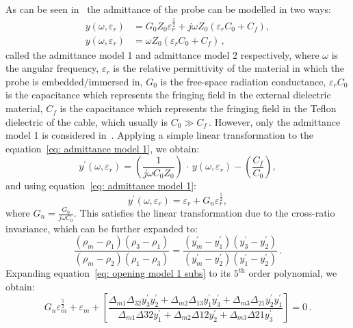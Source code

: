 \documentclass[12pt, a4paper]{article}
\begin{document}
As can be seen in~\cite{marsland1987dielectric} the admittance of the probe can be modelled in two ways:
\begin{align}
    y(\omega, \varepsilon_r) &= G_0 Z_0 \varepsilon_r^{\frac{5}{2}} + j \omega Z_0(\varepsilon_r C_0 + C_f) ,  \label{eq: admittance model 1} \\
    y(\omega, \varepsilon_r) &= \omega Z_0(\varepsilon_r C_0 + C_f)\,, \label{eq: admittance model 2}
\end{align}
called the admittance model 1 and admittance model 2 respectively, where \(\omega\) is the angular frequency, \(\varepsilon_r\) is the relative permittivity of the material in which the probe is embedded/immersed in, \(G_0\) is the free-space radiation conductance, \(\varepsilon_r C_0\) is the capacitance which represents the fringing field in the external dielectric material, \(C_f\) is the capacitance which represents the fringing field in the Teflon dielectric of the cable, which usually is \(C_0 \gg C_f\)\,. However, only the admittance model 1 is considered in~\cite{marsland1987dielectric}. Applying a simple linear transformation to the equation~\ref{eq: admittance model 1}, we obtain:
\begin{equation}
    y^{\prime}(\omega, \varepsilon_r) = \left(\frac{1}{j \omega C_0 Z_0}\right)\, \cdot \,y(\omega , \varepsilon_r) - \left(\frac{C_f}{C_0}\right) , \label{eq: admittance model 1 transformed}
\end{equation}
and using equation~\ref{eq: admittance model 1}:
\begin{equation}
    y^{\prime}(\omega, \varepsilon_r) = \varepsilon_r + G_n \varepsilon_r^\frac{5}{2} , \label{eq: admittance model 1 substitution}
\end{equation}
where \(G_n = \frac{G_0}{j\omega C_0}\). This satisfies the linear transformation due to the cross-ratio invariance, which can be further expanded to:
\begin{equation}
    \frac{(\rho_m - \rho_1)(\rho_3 - \rho_1)}{(\rho_m - \rho_2)(\rho_1 - \rho_3)} = \frac{(y^{\prime}_m - y^{\prime}_1)(y^{\prime}_3 - y^{\prime}_2)}{(y^{\prime}_m - y^{\prime}_2)(y^{\prime}_1 - y^{\prime}_2)}\,. \label{eq: opening model 1 subs}
\end{equation}
Expanding equation~\ref{eq: opening model 1 subs} to its \(5^{\text{th}}\) order polynomial, we obtain:
\begin{equation}
    G_n \varepsilon_m^{\frac{5}{2}} + \varepsilon_m + \left[\frac{\Delta_{m1} \Delta_{32} y^{\prime}_3 y^{\prime}_2 + \Delta_{m2} \Delta_{13} y^{\prime}_1 y^{\prime}_3 + \Delta_{m3} \Delta_{21} y^{\prime}_2 y^{\prime}_1}{\Delta_{m1} \Delta{32} y^{\prime}_1 + \Delta_{m2} \Delta{12} y^{\prime}_2 + \Delta_{m3} \Delta{21} y^{\prime}_3}\right] = 0\,. \label{eq: big substitution}
\end{equation}
\end{document}
